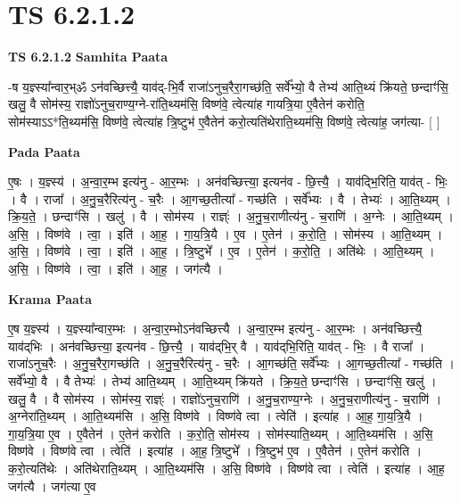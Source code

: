 \documentclass[17pt]{extarticle}
\begin{document}
\section{ TS 6.2.1.2 }

\textbf{TS 6.2.1.2 } \newline
\textbf{Samhita Paata} \newline

-ष य॒ज्ञ्स्या᳚न्वार॒भ्ॐ ऽन॑वच्छित्त्यै॒ याव॑द्-भि॒र्वै राजा॑ऽनुच॒रैरा॒गच्छ॑ति॒ सर्वे᳚भ्यो॒ वै तेभ्य॑ आति॒थ्यं क्रि॑यते॒ छन्दाꣳ॑सि॒ खलु॒ वै सोम॑स्य॒ राज्ञो॑ऽनुच॒राण्य॒ग्ने-रा॑ति॒थ्यम॑सि॒ विष्ण॑वे॒ त्वेत्या॑ह गायत्रि॒या ए॒वैतेन॑ करोति॒ सोम॑स्याऽऽ*ति॒थ्यम॑सि॒ विष्ण॑वे॒ त्वेत्या॑ह त्रि॒ष्टुभ॑ ए॒वैतेन॑ करो॒त्यति॑थेराति॒थ्यम॑सि॒ विष्ण॑वे॒ त्वेत्या॑ह॒ जग॑त्या- [  ] \newline

\textbf{Pada Paata} \newline

ए॒षः । य॒ज्ञ्स्य॑ । अ॒न्वा॒र॒म्भ इत्य॑नु -  आ॒र॒म्भः । अन॑वच्छित्त्या॒ इत्यन॑व - छि॒त्त्यै॒ । याव॑द्भि॒रिति॒ याव॑त् - भिः॒ । वै । राजा᳚ । अ॒नु॒च॒रैरित्य॑नु - च॒रैः । आ॒गच्छ॒तीत्या᳚ - गच्छ॑ति । सर्वे᳚भ्यः । वै । तेभ्यः॑ । आ॒ति॒थ्यम् । क्रि॒य॒ते॒ । छन्दाꣳ॑सि । खलु॑ । वै । सोम॑स्य । राज्ञ्ः॑ । अ॒नु॒च॒राणीत्य॑नु - च॒राणि॑ । अ॒ग्नेः । आ॒ति॒थ्यम् । अ॒सि॒ । विष्ण॑वे । त्वा॒ । इति॑ । आ॒ह॒ । गा॒य॒त्रि॒यै । ए॒व । ए॒तेन॑ । क॒रो॒ति॒ । सोम॑स्य । आ॒ति॒थ्यम् । अ॒सि॒ । विष्ण॑वे । त्वा॒ । इति॑ । आ॒ह॒ । त्रि॒ष्टुभे᳚ । ए॒व । ए॒तेन॑ । क॒रो॒ति॒ । अति॑थेः । आ॒ति॒थ्यम् । अ॒सि॒ । विष्ण॑वे । त्वा॒ । इति॑ । आ॒ह॒ । जग॑त्यै ।  \newline


\textbf{Krama Paata} \newline

ए॒ष य॒ज्ञ्स्य॑ । य॒ज्ञ्स्या᳚न्वार॒म्भः । अ॒न्वा॒र॒म्भोऽन॑वच्छित्त्यै । अ॒न्वा॒र॒म्भ इत्य॑नु - आ॒र॒म्भः । अन॑वच्छित्त्यै॒ याव॑द्‌भिः । अन॑वच्छित्त्या॒ इत्यन॑व - छि॒त्त्यै॒ । याव॑द्‌भि॒र् वै । याव॑द्‌भि॒रिति॒ याव॑त् - भिः॒ । वै राजा᳚ । राजा॑ऽनुच॒रैः । अ॒नु॒च॒रैरा॒गच्छ॑ति । अ॒नु॒च॒रैरित्य॑नु - च॒रैः । आ॒गच्छ॑ति॒ सर्वे᳚भ्यः । आ॒गच्छ॒तीत्या᳚ - गच्छ॑ति । सर्वे᳚भ्यो॒ वै । वै तेभ्यः॑ । तेभ्य॑ आति॒थ्यम् । आ॒ति॒थ्यम् क्रि॑यते । क्रि॒य॒ते॒ छन्दाꣳ॑सि । छन्दाꣳ॑सि॒ खलु॑ । खलु॒ वै । वै सोम॑स्य । सोम॑स्य॒ राज्ञ्ः॑ । राज्ञो॑ऽनुच॒राणि॑ । अ॒नु॒च॒राण्य॒ग्नेः । अ॒नु॒च॒राणीत्य॑नु - च॒राणि॑ । अ॒ग्नेरा॑ति॒थ्यम् । आ॒ति॒थ्यम॑सि । अ॒सि॒ विष्ण॑वे । विष्ण॑वे त्वा । त्वेति॑ । इत्या॑ह । आ॒ह॒ गा॒य॒त्रि॒यै । गा॒य॒त्रि॒या ए॒व । ए॒वैतेन॑ । ए॒तेन॑ करोति । क॒रो॒ति॒ सोम॑स्य । सोम॑स्याति॒थ्यम् । आ॒ति॒थ्यम॑सि । अ॒सि॒ विष्ण॑वे । विष्ण॑वे त्वा । त्वेति॑ । इत्या॑ह । आ॒ह॒ त्रि॒ष्टुभे᳚ । त्रि॒ष्टुभ॑ ए॒व । ए॒वैतेन॑ । ए॒तेन॑ करोति । क॒रो॒त्यति॑थेः । अति॑थेराति॒थ्यम् । आ॒ति॒थ्यम॑सि । अ॒सि॒ विष्ण॑वे । विष्ण॑वे त्वा । त्वेति॑ । इत्या॑ह । आ॒ह॒ जग॑त्यै । जग॑त्या ए॒व \newline
\end{document}
